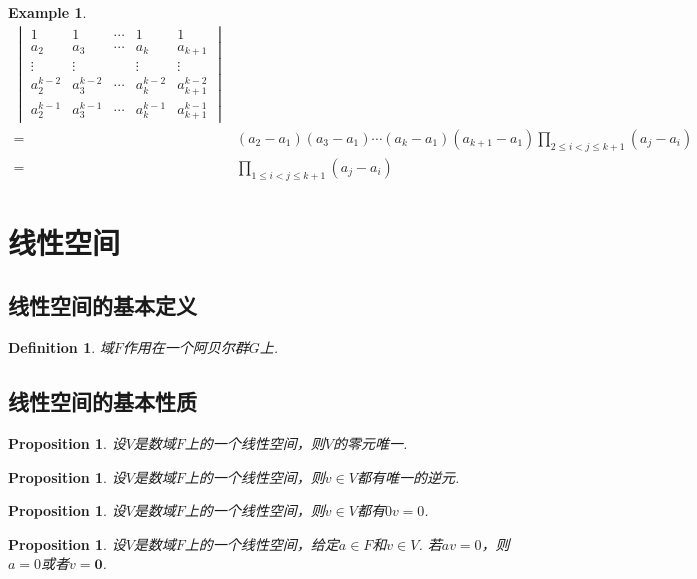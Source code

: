 \documentclass{article}
\newtheorem{proposition}[theorem]{Proposition}
\newtheorem{example}[theorem]{Example}
\newtheorem{definition}[theorem]{Definition}
\newcommand{\mbf}[1]{\bm{#1}}
\begin{document}
\begin{example}
$$\begin{array}{ll}
\begin{vmatrix}
1 & 1& \cdots & 1 & 1\\
a_2 & a_3 & \cdots & a_k & a_{k+1} \\
\vdots & \vdots& &\vdots &\vdots \\
a_2^{k-2} & a_3^{k-2} & \cdots & a_k^{k-2} & a_{k+1}^{k-2} \\
a_2^{k-1} & a_3^{k-1} & \cdots & a_k^{k-1} & a_{k+1}^{k-1} 
\end{vmatrix} \\
=& (a_2-a_1)(a_3-a_1)\cdots(a_k-a_1)(a_{k+1}-a_1) \prod\limits_{2\leq i < j \leq k+1}(a_j - a_i) \\
=& \prod\limits_{1 \leq i < j \leq k+1}(a_j - a_i)
\end{array}
$$
\end{example}

\newpage
\section{线性空间}

\subsection{线性空间的基本定义}

\begin{definition}
\rm 域$F$作用在一个阿贝尔群$G$上.
\end{definition}

\subsection{线性空间的基本性质}

\begin{proposition}
\rm 设$V$是数域$F$上的一个线性空间，则$V$的零元唯一.
\end{proposition}


\begin{proposition}
\rm 设$V$是数域$F$上的一个线性空间，则$v \in V$都有唯一的逆元.
\end{proposition}

\begin{proposition}
\rm 设$V$是数域$F$上的一个线性空间，则$v \in V$都有$0v=0$.
\end{proposition}

\begin{proposition}
\rm 设$V$是数域$F$上的一个线性空间，给定$a \in F$和$v \in V$. 若$av = 0$，则$a = 0$或者$v=\mbf{0}$.
\end{proposition}
\end{document}
